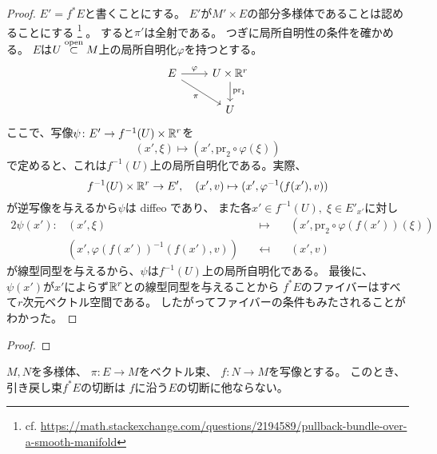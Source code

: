 \documentclass[report]{jlreq}
\begin{document}
\begin{proof}
    $E' = f^* E$と書くことにする。
    $E'$が$M' \times E$の部分多様体であることは認めることにする
    \footnote{
        cf. \url{https://math.stackexchange.com/questions/2194589/pullback-bundle-over-a-smooth-manifold}
    }
    。
    すると$\pi'$は{\smooth}全射である。
    つぎに局所自明性の条件を確かめる。
    $E$は$U \stackrel{\text{open}}{\subset} M$上の局所自明化$\varphi$を持つとする。
    \begin{equation}
        \begin{tikzcd}
            E \ar{r}{\varphi} \ar{rd}[swap]{\pi}
                & U \times \R^r \ar{d}{\mathrm{pr}_1} \\
            & U
        \end{tikzcd}
    \end{equation}
    ここで、{\smooth}写像$\psi \colon E' \to f^{-1}(U) \times \mathbb{R}^r$を
    \begin{equation}
        (x', \xi) \mapsto (x', \mathrm{pr}_2 \circ \varphi (\xi))
    \end{equation}
    で定めると、これは$f^{-1}(U)$上の局所自明化である。実際、
    \begin{equation}
        f^{-1}(U) \times \mathbb{R}^r \to E',
        \quad
        (x', v) \mapsto (x', \varphi^{-1}(f(x'), v))
    \end{equation}
    が{\smooth}逆写像を与えるから$\psi$は diffeo であり、
    また各$x' \in f^{-1}(U),\; \xi \in E'_{x'}$に対し
    \begin{alignat}{2}
        \psi(x') \colon
            &(x', \xi)
            &\quad \mapsto \quad
            &(x', \mathrm{pr}_2 \circ \varphi(f(x')) (\xi)) \\
        &(x', \varphi(f(x'))^{-1} (f(x'), v))
            &\quad \mapsfrom \quad
            &(x', v)
    \end{alignat}
    が線型同型を与えるから、$\psi$は$f^{-1}(U)$上の局所自明化である。
    最後に、$\psi(x')$が$x'$によらず$\mathbb{R}^r$との線型同型を与えることから
    $f^* E$のファイバーはすべて$r$次元ベクトル空間である。
    したがってファイバーの条件もみたされることがわかった。
\end{proof}

\begin{theorem}[引き戻し束の普遍性]
    \TODO{}
\end{theorem}

\begin{proof}
    \TODO{}
\end{proof}

\begin{proposition}[写像に沿う切断と引き戻し束]
    $M, N$を多様体、
    $\pi \colon E \to M$をベクトル束、
    $f \colon N \to M$を{\smooth}写像とする。
    このとき、
    引き戻し束$f^* E$の切断は
    $f$に沿う$E$の切断に他ならない。
\end{proposition}
\end{document}
